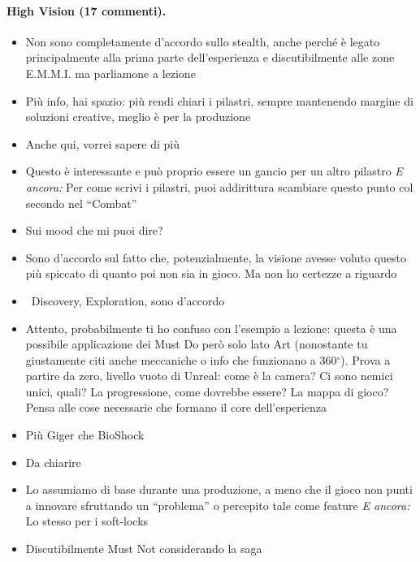 \paragraph{High Vision (17 commenti).}
{\small
\begin{itemize}
  \item {} Non sono completamente d'accordo sullo stealth, anche perché è legato principalmente alla prima parte dell'esperienza e discutibilmente alle zone E.M.M.I. ma parliamone a lezione
  \item {} Più info, hai spazio: più rendi chiari i pilastri, sempre mantenendo margine di soluzioni creative, meglio è per la produzione
  \item {} Anche qui, vorrei sapere di più
  \item {} Questo è interessante e può proprio essere un gancio per un altro pilastro \emph{E ancora:} Per come scrivi i pilastri, puoi addirittura scambiare questo punto col secondo nel ``Combat''
  \item {} Sui mood che mi puoi dire?
  \item \rvVuoto Sono d'accordo sul fatto che, potenzialmente, la visione avesse voluto questo più spiccato di quanto poi non sia in gioco. Ma non ho certezze a riguardo
  \item {} \rvBene\ Discovery, Exploration, sono d'accordo
  \item {} Attento, probabilmente ti ho confuso con l'esempio a lezione: questa è una possibile applicazione dei Must Do però solo lato Art (nonostante tu giustamente citi anche meccaniche o info che funzionano a 360$^\circ$). Prova a partire da zero, livello vuoto di Unreal: come è la camera? Ci sono nemici unici, quali? La progressione, come dovrebbe essere? La mappa di gioco? Pensa alle cose necessarie che formano il core dell'esperienza
  \item {} Più Giger che BioShock
  \item {} Da chiarire
  \item {} Lo assumiamo di base durante una produzione, a meno che il gioco non punti a innovare sfruttando un ``problema'' o percepito tale come feature \emph{E ancora:} Lo stesso per i soft-locks
  \item {} Discutibilmente Must Not considerando la saga

\end{itemize}}

